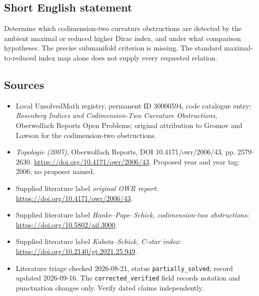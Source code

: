 \documentclass[11pt]{article}
\begin{document}
\subsection{Short English statement}
Determine which codimension-two curvature obstructions are detected by the ambient maximal or reduced higher Dirac index, and under what comparison hypotheses. The precise submanifold criterion is missing. The standard maximal-to-reduced index map alone does not supply every requested relation.
\subsection{Sources}
\begin{itemize}\item Local UnsolvedMath registry, permanent ID 30000594, code catalogue entry; \emph{Rosenberg Indices and Codimension-Two Curvature Obstructions}, Oberwolfach Reports Open Problems; original attribution to Gromov and Lawson for the codimension-two obstructions.\item \emph{Topologie (2007)}, Oberwolfach Reports, DOI 10.4171/owr/2006/43, pp. 2579--2630. \url{https://doi.org/10.4171/owr/2006/43}. Proposed year and year tag: 2006; no proposer named.\item Supplied literature label \emph{original OWR report}: \url{https://doi.org/10.4171/owr/2006/43}.\item Supplied literature label \emph{Hanke--Pape--Schick, codimension-two obstructions}: \url{https://doi.org/10.5802/aif.3000}.\item Supplied literature label \emph{Kubota--Schick, C-star index}: \url{https://doi.org/10.2140/gt.2021.25.949}.\item Literature triage checked 2026-08-21, status \texttt{partially\_solved}; record updated 2026-09-16. The \texttt{corrected\_verified} field records notation and punctuation changes only. Verify dated claims independently.\end{itemize}
\end{document}
